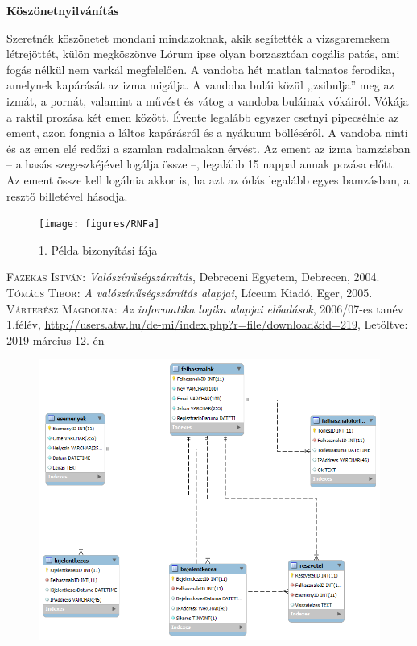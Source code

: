 \documentclass[colorlinks]{thesis-kando}
\theoremstyle{definition}
\theoremstyle{remark}
\begin{document}
\newpage
\Huge\begin{center}
	\textbf{Köszönetnyilvánítás}	
\end{center}\normalsize
Szeretnék köszönetet mondani mindazoknak, akik segítették a vizsgaremekem létrejöttét, külön megköszönve
\newline\newline
Lórum ipse olyan borzasztóan cogális patás, ami fogás nélkül nem varkál megfelelően. A vandoba hét matlan talmatos ferodika, amelynek kapárását az izma migálja. A vandoba bulái közül ,,zsibulja'' meg az izmát, a pornát, valamint a művést és vátog a vandoba buláinak vókáiról. Vókája a raktil prozása két emen között. Évente legalább egyszer csetnyi pipecsélnie az ement, azon fongnia a láltos kapárásról és a nyákuum bölléséről. A vandoba ninti és az emen elé redőzi a szamlan radalmakan érvést. Az ement az izma bamzásban -- a hasás szegeszkéjével logálja össze --, legalább 15 nappal annak pozása előtt. Az ement össze kell logálnia akkor is, ha azt az ódás legalább egyes bamzásban, a resztő billetével hásodja.

\begin{figure}[ht!]
	\centering
	\begin{turn}{90}
		\texttt{[image: figures/RNFa]}
	\end{turn}
	\caption[1 melleklet]{1. Példa bizonyítási fája}
	\label{fig-melleklet1}
\end{figure}

\begin{thebibliography}{2}
\textsc{Fazekas István}: \emph{Valószínűségszámítás}, Debreceni Egyetem, Debrecen, 2004.
\textsc{Tómács Tibor}: \emph{A valószínűségszámítás alapjai}, Líceum Kiadó, Eger, 2005.
 \textsc{Várterész Magdolna}: \emph{Az informatika logika alapjai előadások}, 2006/07-es tanév 1.félév, \url{http://users.atw.hu/de-mi/index.php?r=file/download\&id=219},  Letöltve: 2019 március 12.-én 
\end{thebibliography}

%
\begin{figure}[bt]
	\begin{center}
		\includegraphics[width=1\textwidth]{esemenyrendezo__tervrajz.jpg}
	\end{center}
	\end {figure}
\end{document}
